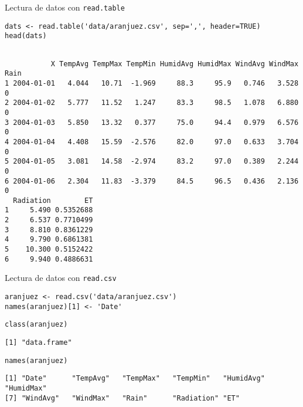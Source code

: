 \documentclass[xcolor={usenames,svgnames,dvipsnames}]{beamer}
\begin{document}
\begin{frame}[label={sec:orgecff3c0},fragile]{Lectura de datos con \texttt{read.table}}
 \lstset{language=r,label= ,caption= ,captionpos=b,numbers=none}
\begin{lstlisting}
dats <- read.table('data/aranjuez.csv', sep=',', header=TRUE)
head(dats)
\end{lstlisting}

\begin{verbatim}

           X TempAvg TempMax TempMin HumidAvg HumidMax WindAvg WindMax Rain
1 2004-01-01   4.044   10.71  -1.969     88.3     95.9   0.746   3.528    0
2 2004-01-02   5.777   11.52   1.247     83.3     98.5   1.078   6.880    0
3 2004-01-03   5.850   13.32   0.377     75.0     94.4   0.979   6.576    0
4 2004-01-04   4.408   15.59  -2.576     82.0     97.0   0.633   3.704    0
5 2004-01-05   3.081   14.58  -2.974     83.2     97.0   0.389   2.244    0
6 2004-01-06   2.304   11.83  -3.379     84.5     96.5   0.436   2.136    0
  Radiation        ET
1     5.490 0.5352688
2     6.537 0.7710499
3     8.810 0.8361229
4     9.790 0.6861381
5    10.300 0.5152422
6     9.940 0.4886631
\end{verbatim}
\end{frame}

\begin{frame}[label={sec:orgca1806b},fragile]{Lectura de datos con \texttt{read.csv}}
 \lstset{language=r,label= ,caption= ,captionpos=b,numbers=none}
\begin{lstlisting}
aranjuez <- read.csv('data/aranjuez.csv')
names(aranjuez)[1] <- 'Date'
\end{lstlisting}

\lstset{language=r,label= ,caption= ,captionpos=b,numbers=none}
\begin{lstlisting}
class(aranjuez)
\end{lstlisting}

\begin{verbatim}
[1] "data.frame"
\end{verbatim}


\lstset{language=r,label= ,caption= ,captionpos=b,numbers=none}
\begin{lstlisting}
names(aranjuez)
\end{lstlisting}

\begin{verbatim}
[1] "Date"      "TempAvg"   "TempMax"   "TempMin"   "HumidAvg"  "HumidMax" 
[7] "WindAvg"   "WindMax"   "Rain"      "Radiation" "ET"
\end{verbatim}
\end{frame}
\end{document}
